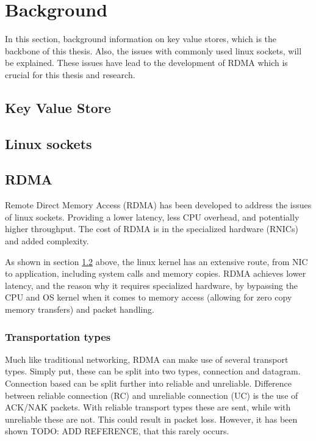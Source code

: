 
\chapter{Background}\label{ch:background} %



\ifpdf
    \graphicspath{{7/figures/PNG/}{7/figures/PDF/}{7/figures/}}
\else
    \graphicspath{{7/figures/EPS/}{7/figures/}}
\fi


%
%
In this section, background information on key value stores, which is the backbone of this thesis.
Also, the issues with commonly used linux sockets, will be explained.
These issues have lead to the development of RDMA which is crucial for this thesis and research.

\section[KV-store]{Key Value Store}\label{sec:kv-store}

\section[Linux scokets]{Linux sockets}\label{sec:linux-sockets}

\section[RDMA]{RDMA}\label{sec:rdma}
Remote Direct Memory Access (RDMA) has been developed to address the issues of linux sockets.
Providing a lower latency, less CPU overhead, and potentially higher throughput.
The cost of RDMA is in the specialized hardware (RNICs) and added complexity.

As shown in section \ref{sec:linux-sockets} above, the linux kernel has an extensive route, from NIC to application, including system calls and memory copies.
RDMA achieves lower latency, and the reason why it requires specialized hardware, by bypassing the CPU and OS kernel when it comes to memory access (allowing for zero copy memory transfers) and packet handling.

\subsection{Transportation types}
Much like traditional networking, RDMA can make use of several transport types.
Simply put, these can be split into two types, connection and datagram.
Connection based can be split further into reliable and unreliable.
Difference between reliable connection (RC) and unreliable connection (UC) is the use of ACK/NAK packets.
With reliable transport types these are sent, while with unreliable these are not.
This could result in packet loss.
However, it has been shown TODO: ADD REFERENCE, that this rarely occurs.

